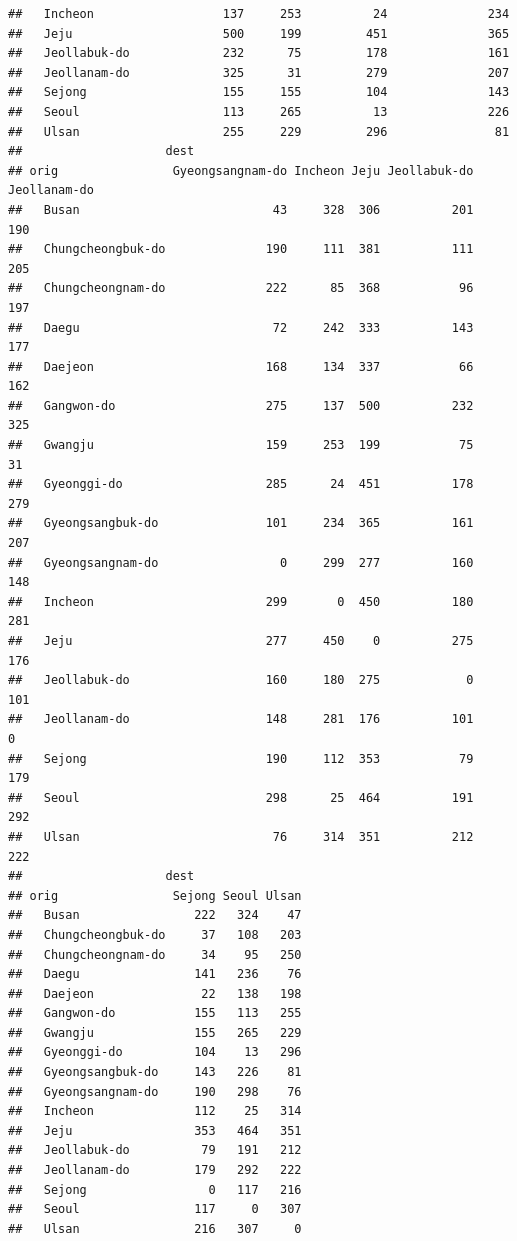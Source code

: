\documentclass[
]{book}
\begin{document}
\begin{verbatim}
##   Incheon                  137     253          24              234
##   Jeju                     500     199         451              365
##   Jeollabuk-do             232      75         178              161
##   Jeollanam-do             325      31         279              207
##   Sejong                   155     155         104              143
##   Seoul                    113     265          13              226
##   Ulsan                    255     229         296               81
##                    dest
## orig                Gyeongsangnam-do Incheon Jeju Jeollabuk-do Jeollanam-do
##   Busan                           43     328  306          201          190
##   Chungcheongbuk-do              190     111  381          111          205
##   Chungcheongnam-do              222      85  368           96          197
##   Daegu                           72     242  333          143          177
##   Daejeon                        168     134  337           66          162
##   Gangwon-do                     275     137  500          232          325
##   Gwangju                        159     253  199           75           31
##   Gyeonggi-do                    285      24  451          178          279
##   Gyeongsangbuk-do               101     234  365          161          207
##   Gyeongsangnam-do                 0     299  277          160          148
##   Incheon                        299       0  450          180          281
##   Jeju                           277     450    0          275          176
##   Jeollabuk-do                   160     180  275            0          101
##   Jeollanam-do                   148     281  176          101            0
##   Sejong                         190     112  353           79          179
##   Seoul                          298      25  464          191          292
##   Ulsan                           76     314  351          212          222
##                    dest
## orig                Sejong Seoul Ulsan
##   Busan                222   324    47
##   Chungcheongbuk-do     37   108   203
##   Chungcheongnam-do     34    95   250
##   Daegu                141   236    76
##   Daejeon               22   138   198
##   Gangwon-do           155   113   255
##   Gwangju              155   265   229
##   Gyeonggi-do          104    13   296
##   Gyeongsangbuk-do     143   226    81
##   Gyeongsangnam-do     190   298    76
##   Incheon              112    25   314
##   Jeju                 353   464   351
##   Jeollabuk-do          79   191   212
##   Jeollanam-do         179   292   222
##   Sejong                 0   117   216
##   Seoul                117     0   307
##   Ulsan                216   307     0
\end{verbatim}
\end{document}
